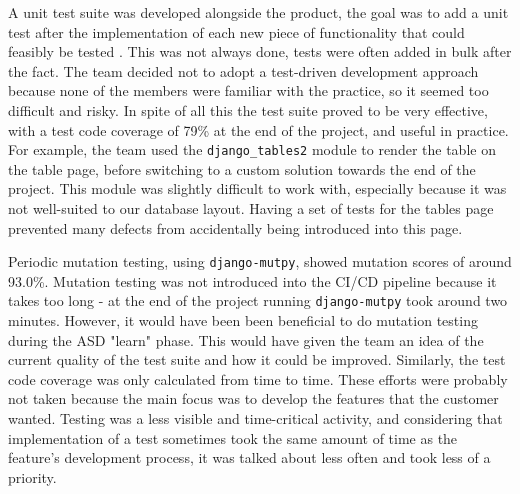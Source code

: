\documentclass{l3proj}
\begin{document}
A unit test suite was developed alongside the product, the goal was to add a unit test after the implementation of each new piece of functionality that could feasibly be tested \cite{UnitTest}. This was not always done, tests were often added in bulk after the fact. The team decided not to adopt a test-driven development approach because none of the members were familiar with the practice, so it seemed too difficult and risky. In spite of all this the test suite proved to be very effective, with a test code coverage of 79\% at the end of the project, and useful in practice. For example, the team used the \texttt{django\_tables2} module to render the table on the table page, before switching to a custom solution towards the end of the project. This module was slightly difficult to work with, especially because it was not well-suited to our database layout. Having a set of tests for the tables page prevented many defects from accidentally being introduced into this page.

Periodic mutation testing, using \texttt{django-mutpy}, showed mutation scores of around 93.0\%. Mutation testing was not introduced into the CI/CD pipeline because it takes too long - at the end of the project running \texttt{django-mutpy} took around two minutes. However, it would have been been beneficial to do mutation testing during the ASD "learn" phase. This would have given the team an idea of the current quality of the test suite and how it could be improved. Similarly, the test code coverage was only calculated from time to time. These efforts were probably not taken because the main focus was to develop the features that the customer wanted. Testing was a less visible and time-critical activity, and considering that implementation of a test sometimes took the same amount of time as the feature's development process, it was talked about less often \cite{Testing} and took less of a priority.
\end{document}
